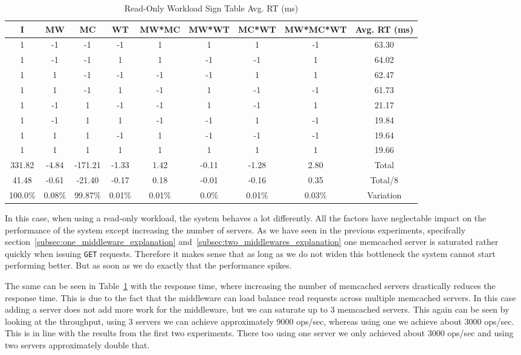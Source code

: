 \documentclass[11pt,a4paper]{article}
\begin{document}
%
\begin{table}[H]
\centering
\scriptsize{
\begin{tabular}{|c|ccccccc|c|}
\hline I & MW & MC & WT & MW*MC & MW*WT & MC*WT & MW*MC*WT & Avg. RT (ms)\\
\hline
1 & -1 & -1 & -1 & 1 & 1 & 1 & -1 & 63.30\\
1 & -1 & -1 & 1 & 1 & -1 & -1 & 1 & 64.02\\
1 & 1 & -1 & -1 & -1 & -1 & 1 & 1 & 62.47\\
1 & 1 & -1 & 1 & -1 & 1 & -1 & -1 & 61.73\\
1 & -1 & 1 & -1 & -1 & 1 & -1 & 1 & 21.17\\
1 & -1 & 1 & 1 & -1 & -1 & 1 & -1 & 19.84\\
1 & 1 & 1 & -1 & 1 & -1 & -1 & -1 & 19.64\\
1 & 1 & 1 & 1 & 1 & 1 & 1 & 1 & 19.66\\
\hline
331.82 & -4.84 & -171.21 & -1.33 & 1.42 & -0.11 & -1.28 & 2.80 & Total\\
41.48 & -0.61 & -21.40 & -0.17 & 0.18 & -0.01 & -0.16 & 0.35 & Total/8\\
100.0\% & 0.08\% & 99.87\% & 0.01\% & 0.01\% & 0.0\% & 0.01\% & 0.03\% & Variation\\
\hline
\end{tabular}
}
\caption{Read-Only Workload Sign Table Avg. RT (ms)}
\label{2k_get_rt}
\end{table}
%
In this case, when using a read-only workload, the system behaves a lot differently.
%
All the factors have neglectable impact on the performance of the system except increasing the number of servers.
%
As we have seen in the previous experiments, specifcally section~\ref{subsec:one_middleware_explanation} and~\ref{subsec:two_middlewares_explanation} one memcached server is saturated rather quickly when issuing \texttt{GET} requests.
%
Therefore it makes sense that as long as we do not widen this bottleneck the system cannot start performing better.
%
But as soon as we do exactly that the performance spikes.
%
\par
%
The same can be seen in Table~\ref{2k_get_rt} with the response time, where increasing the number of memcached servers drastically reduces the response time.
%
This is due to the fact that the middleware can load balance read requests across multiple memcached servers.
%
In this case adding a server does not add more work for the middleware, but we can saturate up to 3 memcached servers.
%
This again can be seen by looking at the throughput, using 3 servers we can achieve approximately 9000 ops/sec, whereas using one we achieve about 3000 ops/sec.
%
This is in line with the results from the first two experiments.
%
There too using one server we only achieved about 3000 ops/sec and using two servers approximately double that.
%
\end{document}
